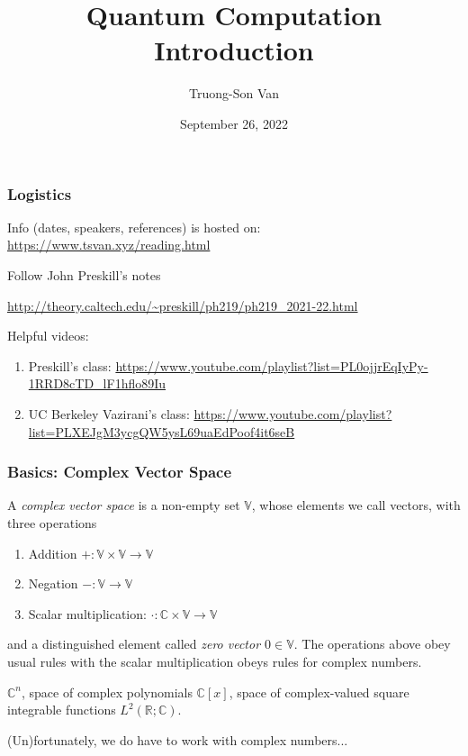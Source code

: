 \documentclass[12pt]{beamer}
\title{ Quantum Computation \\ Introduction }
\author{Truong-Son Van}
\institute{Fulbright University Vietnam Reading Group}
\date{September 26, 2022}
\begin{document}
\frame{\titlepage}

\begin{frame}
    \frametitle{Logistics}
    Info (dates, speakers, references) is hosted on: \url{https://www.tsvan.xyz/reading.html}
    
    Follow John Preskill's notes 

    \url{http://theory.caltech.edu/~preskill/ph219/ph219_2021-22.html}

    Helpful videos:
    \begin{enumerate}
        \item Preskill's class: \url{https://www.youtube.com/playlist?list=PL0ojjrEqIyPy-1RRD8cTD_lF1hflo89Iu}
        \item UC Berkeley Vazirani's class: \url{https://www.youtube.com/playlist?list=PLXEJgM3ycgQW5ysL69uaEdPoof4it6seB}
    \end{enumerate}
\end{frame}

\begin{frame}
    \frametitle{ Basics: Complex Vector Space}
    A \emph{complex vector space} is a non-empty set $\mathbb{V}$, whose elements we call vectors, with three 
    operations
    \begin{enumerate}
        \item Addition $+: \mathbb{V} \times \mathbb{V} \to \mathbb{V}$
        \item Negation $-: \mathbb{V}\to \mathbb{V}$
        \item Scalar multiplication: $\cdot : \mathbb{C} \times \mathbb{V} \to \mathbb{V}$
    \end{enumerate}
    and a distinguished element called \emph{zero vector $0\in \mathbb{V}$}.
    The operations above obey usual rules with the scalar multiplication obeys rules for complex numbers.


    \begin{example}
        $\mathbb{C}^n$, space of complex polynomials $\mathbb{C}[x]$, 
        space of complex-valued square integrable functions $L^2(\mathbb{R};\mathbb{C})$.
    \end{example}

    (Un)fortunately, we do have to work with complex numbers...
\end{frame}
\end{document}
